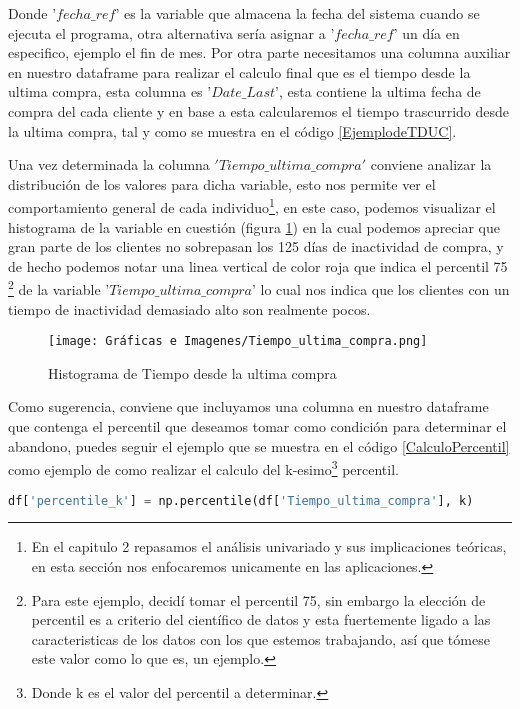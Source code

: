 Donde '$fecha\_ref$' es la variable que almacena la fecha del sistema cuando se ejecuta el programa, otra alternativa sería asignar a '$fecha\_ref$' un día en especifico, ejemplo el fin de mes. Por otra parte necesitamos una columna auxiliar en nuestro dataframe para realizar el calculo final que es el tiempo desde la ultima compra, esta columna es '$Date\_Last$', esta contiene la ultima fecha de compra del cada cliente y en base a esta calcularemos el tiempo trascurrido desde la ultima compra, tal y como se muestra en el código \ref{EjemplodeTDUC}.

Una vez determinada la columna $'Tiempo\_ultima\_compra'$ conviene analizar la distribución de los valores para dicha variable, esto nos permite ver el comportamiento general de cada individuo\footnote{En el capitulo 2 repasamos el análisis univariado y sus implicaciones teóricas, en esta sección nos enfocaremos unicamente en las aplicaciones.}, en este caso, podemos visualizar el histograma de la variable en cuestión (figura \ref{fig:enter-label5}) en la cual podemos apreciar que gran parte de los clientes no sobrepasan los 125 días de inactividad de compra, y de hecho podemos notar una linea vertical de color roja que indica el percentil 75 \footnote{Para este ejemplo, decidí tomar el percentil 75, sin embargo la elección de percentil es a criterio del científico de datos y esta fuertemente ligado a las caracteristicas de los datos con los que estemos trabajando, así que tómese este valor como lo que es, un ejemplo.} de la variable '$Tiempo\_ultima\_compra$' lo cual nos indica que los clientes con un tiempo de inactividad demasiado alto son realmente pocos.

\begin{center}
	\begin{figure}[H]
		\centering
		\texttt{[image: Gráficas e Imagenes/Tiempo\_ultima\_compra.png]}
		\caption{Histograma de Tiempo desde la ultima compra}
		\label{fig:enter-label5}
	\end{figure}
\end{center}

Como sugerencia, conviene que incluyamos una columna en nuestro dataframe que contenga el percentil que deseamos tomar como condición para determinar el abandono, puedes seguir el ejemplo que se muestra en el código \ref{CalculoPercentil} como ejemplo de como realizar el calculo del k-esimo\footnote{Donde k es el valor del percentil a determinar.} percentil.

\begin{lstlisting}[language=Python, caption=Ejemplo de como determinar el percentil n, label=CalculoPercentil]
	df['percentile_k'] = np.percentile(df['Tiempo_ultima_compra'], k)
\end{lstlisting}

